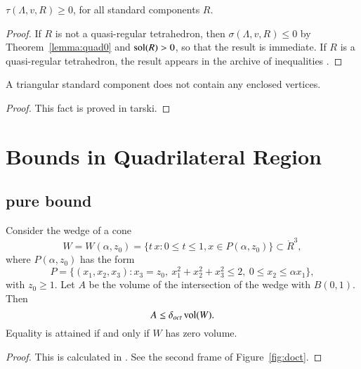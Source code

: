 \begin{lemma}\label{lemma:roger0}
    $\tau(\Lambda,v,R)\ge 0$, for all standard components $R$.
\end{lemma}


\begin{proof}
If $R$ is not a quasi-regular tetrahedron, then $\sigma(\Lambda,v,R)\le0$
by Theorem~\ref{lemma:quad0} and $\operatorname{sol}(R)> 0$, so that the result
is immediate. If $R$ is a quasi-regular tetrahedron, the result
appears in the archive of inequalities .
\end{proof}



\begin{lemma}
        \label{lemma:no-enclosed-tri}
        A triangular standard component does not contain any enclosed
        vertices.
\end{lemma}

\begin{proof}
    This fact is proved in tarski.
\end{proof}



\section{Bounds in Quadrilateral Region}%
    \label{sec:bounds}



\subsection{pure bound}%



\begin{lemma} \label{lemma:wedge} Consider the wedge of a cone
    $$
    W =W(\alpha,z_0) =
    \{ t\, x : 0\le t \le 1, x\in P(\alpha,z_0)\}\subset\ring{R}^3,
    $$
where $P(\alpha,z_0)$ has the form
    $$
    P = \{(x_1,x_2,x_3) :
    x_3 = z_0,\   x_1^2+x_2^2+x_3^2\le 2,\ 0\le x_2\le \alpha x_1\},
    $$
with $z_0\ge1$.  Let $A$ be the volume of the intersection of the
wedge with $B(0,1)$. Then
    $$A\le\delta_{oct}\,{\operatorname{vol}}(W).$$
Equality is attained if and only if $W$ has zero volume.
\end{lemma}

\begin{proof} This is calculated in \cite[Sec. 4]{part2}.  See the
second frame of Figure~\ref{fig:doct}.
\end{proof}

